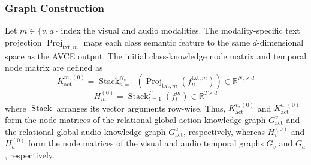 \documentclass[10pt,journal,twoside]{IEEEtran}
\begin{document}
\subsubsection{Graph Construction}
Let $m\in\{v,a\}$ index the visual and audio modalities. The modality-specific text projection $\operatorname{Proj}_{\mathrm{txt},m}$ maps each class semantic feature to the same $d$-dimensional space as the AVCE output. The initial class-knowledge node matrix and temporal node matrix are defined as
\begin{equation}
K_{\mathrm{act}}^{m,(0)} = \operatorname{Stack}_{n=1}^{N_c}\left(\operatorname{Proj}_{\mathrm{txt},m}\left(f_n^{\mathrm{txt},m}\right)\right)\in\mathbb{R}^{N_c\times d}
\end{equation}
\begin{equation}
H_m^{(0)} = \operatorname{Stack}_{t=1}^{T}\left(f_t^m\right)\in\mathbb{R}^{T\times d}
\end{equation}
where $\operatorname{Stack}$ arranges its vector arguments row-wise. Thus, $K_{\mathrm{act}}^{v,(0)}$ and $K_{\mathrm{act}}^{a,(0)}$ form the node matrices of the relational global action knowledge graph $G_{\mathrm{act}}^v$ and the relational global audio knowledge graph $G_{\mathrm{act}}^a$, respectively, whereas $H_v^{(0)}$ and $H_a^{(0)}$ form the node matrices of the visual and audio temporal graphs $G_v$ and $G_a$, respectively.
\end{document}
